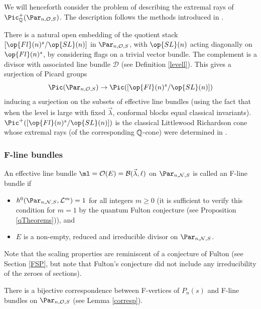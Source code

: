 We will henceforth consider the problem of describing the extremal rays of $\Pic^+_{\Bbb{Q}}(\Par_{n,\mathcal{O},S})$. The description follows the methods introduced in  \cite{BHermit,BKiers,Kiers}.

\begin{remark}
\notready\label{classicall}
There is a natural open embedding of the quotient stack   $[\op{Fl}(n)^s/\op{SL}(n)]$ in $\Par_{n,\mathcal{O},S}$, with $\op{SL}(n)$ acting diagonally on $\op{Fl}(n)^s$, by considering flags on a trivial vector bundle. The complement is a divisor with associated line bundle $\mathcal{D}$ (see Definition \ref{levell}). This gives a surjection of Picard groups
$$\Pic(\Par_{n,\mathcal{O},S})\to \Pic([\op{Fl}(n)^s/\op{SL}(n)])$$
inducing a surjection on the subsets of effective line bundles (using the fact that when the level is large with fixed $\vec{\lambda}$, conformal blocks equal classical invariants).  $\Pic^+([\op{Fl}(n)^s/\op{SL}(n)])$ is the classical Littlewood Richardson cone whose extremal rays (of the corresponding $\Bbb{Q}$-cone) were determined in \cite{BHermit}.
\end{remark}
\subsubsection{F-line bundles}\label{Def_F}
  \begin{defi}
\notready\label{defF}
 An effective line bundle $\ml=\mathcal{O}(E)=\mathcal{B}(\vec{\lambda},\ell)$ on $\Par_{n,\mathcal{N},S}$ is called an F-line bundle if
 \begin{itemize}
 \item[-]$h^0(\Par_{n,\mathcal{N},S},\mathcal{L}^m)=1$ for all integers $m\geq 0$ (it is sufficient to verify this condition for $m=1$ by the quantum Fulton conjecture (see Proposition \ref{qTheorems})), and
 \item[-] $E$ is a non-empty, reduced and irreducible divisor on $\Par_{n,\mathcal{N},S}$.
 \end{itemize}
 \end{defi}
 Note that the scaling properties are reminiscent of a conjecture of Fulton (see Section \ref{FSP}, but note that Fulton's conjecture did not include any irreducibility of the zeroes of sections).

There is a bijective correspondence between  F-vertices of $P_{n}(s)$ and  F-line bundles on $\Par_{n,\mathcal{O},S}$ (see Lemma \ref{corresp}).

